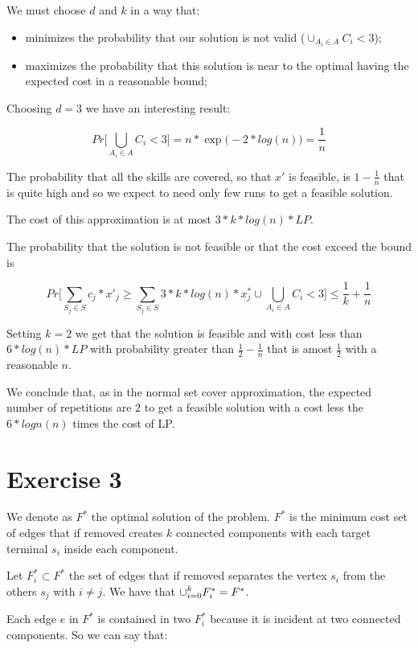 \documentclass[paper=a4, fontsize=11pt]{scrartcl} %
\numberwithin{equation}{section} %
\numberwithin{figure}{section} %
\numberwithin{table}{section} %
\begin{document}
We must choose $d$ and $k$ in a way that:

\begin{itemize}
    \item minimizes the probability that our solution is not valid ($\cup_{A_i \in A} C_i < 3$);
    \item maximizes the probability that this solution is near to the optimal having the expected cost in a reasonable bound;
\end{itemize}

Choosing $d = 3$ we have an interesting result:

\[
Pr\Big[\bigcup_{A_i \in A} C_i < 3\Big] = n*\exp\big(-2*log(n)\big) = \frac{1}{n}
\]

The probability that all the skills are covered, so that $x'$ is feasible, is $1 - \frac{1}{n}$ that is quite high and so we expect to need only few runs to get a feasible solution.

The cost of this approximation is at most $3*k*log(n)*LP$.

The probability that the solution is not feasible or that the cost exceed the bound is

\[
Pr\Big[\sum_{S_j \in S} c_j*x'_j \geq \sum_{S_j \in S} 3*k*log(n)*x^*_j \cup \bigcup_{A_i \in A} C_i < 3\Big] \leq \frac{1}{k} + \frac{1}{n}
\]

Setting $k = 2$ we get that the solution is feasible and with cost less than $6*log(n)*LP$ with probability greater than $\frac{1}{2} - \frac{1}{n}$ that is amost $\frac{1}{2}$ with a reasonable $n$.

We conclude that, as in the normal set cover approximation, the expected number of repetitions are $2$ to get a feasible solution with a cost less the $6*logn(n)$ times the cost of LP.

\newpage
\section{Exercise 3}

We denote as $F^*$ the optimal solution of the problem. $F^*$ is the minimum cost set of edges that if removed creates $k$ connected components with each target terminal $s_i$ inside each component.

Let $F_i^* \subset F^*$ the set of edges that if removed separates the vertex $s_i$ from the others $s_j$ with $i \ne j$. We have that $\mathlarger{\cup}_{i = 0}^k F_i^* = F^*$.

Each edge $e$ in $F^*$ is contained in two $F_i^*$ because it is incident at two connected components. So we can say that:
\end{document}
